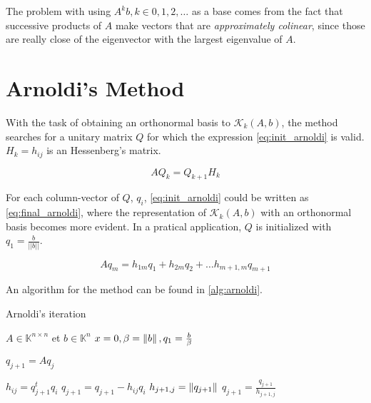 The problem with using ${A^{k}b}, k \in {0,1,2,\dots}$ as a base comes from the fact that successive products of $A$ make vectors that are \textit{approximately colinear}, since those are really close of the eigenvector with the largest eigenvalue of $A$.

\section{Arnoldi's Method}

With the task of obtaining an orthonormal basis to $\mathcal{K}_{k}(A,b)$, the method searches for a unitary matrix $Q$ for which the expression \ref{eq:init_arnoldi} is valid. $H_{k}={h_{ij}}$ is an Hessenberg's matrix.


\begin{equation} \label{eq:init_arnoldi}
    AQ_{k} = Q_{k+1}H_{k}
\end{equation}

For each column-vector of $Q$, $q_{i}$, \ref{eq:init_arnoldi} could be written as \ref{eq:final_arnoldi}, where the representation of $\mathcal{K}_{k}(A,b)$ with an orthonormal basis becomes more evident. In a pratical application, $Q$ is initialized with $q_{1} = \frac{b}{||b||}$.

\begin{equation}\label{eq:final_arnoldi}
    Aq_{m} = h_{1m}q_{1} + h_{2m}q_{2} + \dots h_{m+1,m}q_{m+1}
\end{equation}

An algorithm for the method can be found in \ref{alg:arnoldi}.

\begin{algorithm}
    \caption{Arnoldi's iteration}\label{alg:arnoldi}
    \begin{algorithmic}[1]
        \State $A \in \mathbb{K}^{n \times n}$ et $b\in \mathbb{K}^{n}$
        \State $x=0, \beta=\left\lVert b\right\rVert,q_{1}=\frac{b}{\beta}$

        \State $q_{j+1} = Aq_{j}$

        \State $h_{ij}= q_{j+1}^{t}q_{i}$
        \State $q_{j+1} = q_{j+1} - h_{ij}q_{i}$
        \EndFor
        \State $h_{j+1,j}=\left\lVert q_{j+1}\right\rVert$
        \State $q_{j+1} = \frac{q_{j+1}}{h_{j+1,j}}$
        \EndFor

    \end{algorithmic}
\end{algorithm}